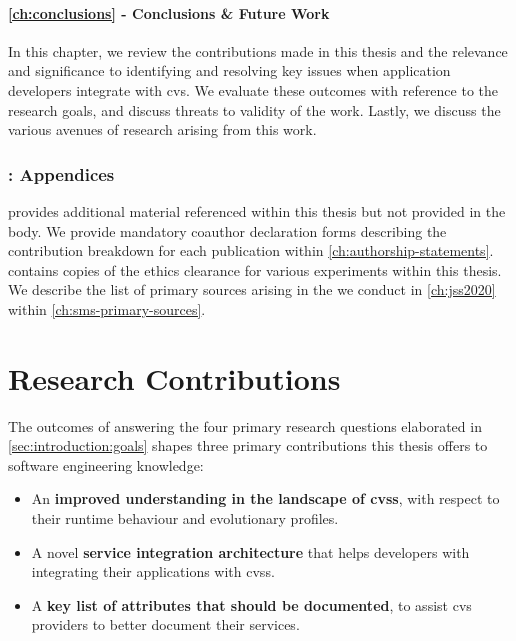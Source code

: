 \paragraph{\cref{ch:conclusions} - Conclusions \& Future Work} In this chapter, we review the contributions made in this thesis and the relevance and significance to identifying and resolving key issues when application developers integrate with \gls{cvs}. We evaluate these outcomes with reference to the research goals, and discuss threats to validity of the work. Lastly, we discuss the various avenues of research arising from this work.

\subsubsection{: Appendices}

 provides additional material referenced within this thesis but not provided in the body. We provide mandatory coauthor declaration forms describing the contribution breakdown for each publication within \cref{ch:authorship-statements}.  contains copies of the ethics clearance for various experiments within this thesis. We describe the list of primary sources arising in the  we conduct in \cref{ch:jss2020} within \cref{ch:sms-primary-sources}.

\section{Research Contributions}
\label{sec:introduction:research-contributions}

\newcontent
The outcomes of answering the four primary research questions elaborated in \cref{sec:introduction:goals} shapes three primary contributions this thesis offers to software engineering knowledge:

\begin{itemize}
  \item An \textbf{improved understanding in the landscape of \glspl{cvs}}, with respect to their runtime behaviour and evolutionary profiles. 
  \item A novel \textbf{service integration architecture} that helps developers with integrating their applications with \glspl{cvs}.
  \item A \textbf{key list of attributes that should be documented}, to assist \gls{cvs} providers to better document their services.
\end{itemize}

